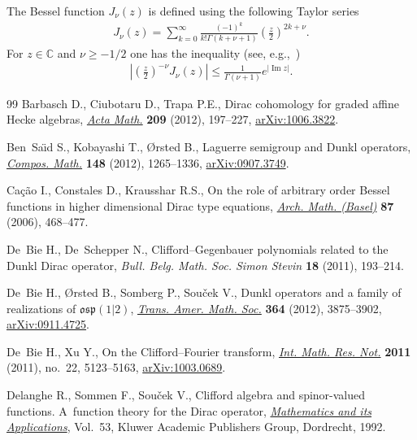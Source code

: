 \documentclass[11pt]{article}
\numberwithin{equation}{section}
\numberwithin{theorem}{section}
\numberwithin{proposition}{section}
\numberwithin{lemma}{section}
\numberwithin{corollary}{section}
\numberwithin{definition}{section}
\numberwithin{example}{section}
\numberwithin{remark}{section}
\numberwithin{note}{section}
\theoremstyle{remark}
\newcommand{\mC}{\mathbb{C}}
\begin{document}
The Bessel function $J_{\nu}(z)$ is def\/ined using the following Taylor series
\begin{gather*}
J_{\nu}(z)=\sum_{k=0}^\infty\frac{(-1)^k}{k!\Gamma(k+\nu+1)}
{\left({\frac{z}{2}}\right)}^{2k+\nu}.
\end{gather*}
For $z\in\mC$ and $\nu\geq-1/2$ one has the inequality (see, e.g.,~\cite{Sz})
\begin{gather}\label{estimateBessel}
\left|\left(\frac{z}{2}\right)^{-\nu}J_{\nu}(z)\right|\leq\frac{1}{\Gamma(\nu+1)}e^{|\operatorname{Im}{z}|}.
\end{gather}
\begin{thebibliography}{99}
Barbasch D., Ciubotaru D., Trapa P.E., Dirac cohomology for graded af\/f\/ine
{H}ecke algebras, \href{http://dx.doi.org/10.1007/s11511-012-0085-3}{\textit{Acta Math.}}
\textbf{209} (2012), 197--227,
\href{http://arxiv.org/abs/1006.3822}{arXiv:1006.3822}.

Ben~Sa{\"{\i}}d S., Kobayashi T., {\O}rsted B., Laguerre semigroup and {D}unkl
operators, \href{http://dx.doi.org/10.1112/S0010437X11007445}{\textit{Compos.
Math.}} \textbf{148} (2012), 1265--1336,
\href{http://arxiv.org/abs/0907.3749}{arXiv:0907.3749}.

Ca{\c{c}}{\~a}o I., Constales D., Krausshar R.S., On the role of arbitrary
order {B}essel functions in higher dimensional {D}irac type equations,
\href{http://dx.doi.org/10.1007/s00013-006-1791-x}{\textit{Arch.
Math.
(Basel)}} \textbf{87} (2006), 468--477.

De~Bie H., De~Schepper N., Clif\/ford--{G}egenbauer polynomials related to the
{D}unkl {D}irac operator, \textit{Bull.
Belg.
Math.
Soc.
Simon Stevin}
\textbf{18} (2011), 193--214.

De~Bie H., {\O}rsted B., Somberg P., Sou{\v{c}}ek V., Dunkl operators and a
family of realizations of {$\mathfrak{osp}(1\vert2)$},
\href{http://dx.doi.org/10.1090/S0002-9947-2012-05608-X}{\textit{Trans.
Amer.
Math.
Soc.}} \textbf{364} (2012), 3875--3902, \href{http://arxiv.org/abs/0911.4725}{arXiv:0911.4725}.

De~Bie H., Xu Y., On the {C}lif\/ford--{F}ourier transform,
\href{http://dx.doi.org/10.1093/imrn/rnq288}{\textit{Int.
Math.
Res.
Not.}} \textbf{2011} (2011), no.~22, 5123--5163,
\href{http://arxiv.org/abs/1003.0689}{arXiv:1003.0689}.

Delanghe R., Sommen F., Sou{\v{c}}ek V., Clif\/ford algebra and spinor-valued
functions.
A~function theory for the Dirac operator,
\href{http://dx.doi.org/10.1007/978-94-011-2922-0}{\textit{Mathematics and
its Applications}}, Vol.~53, Kluwer Academic Publishers Group, Dordrecht,
1992.


\end{thebibliography}
\end{document}
